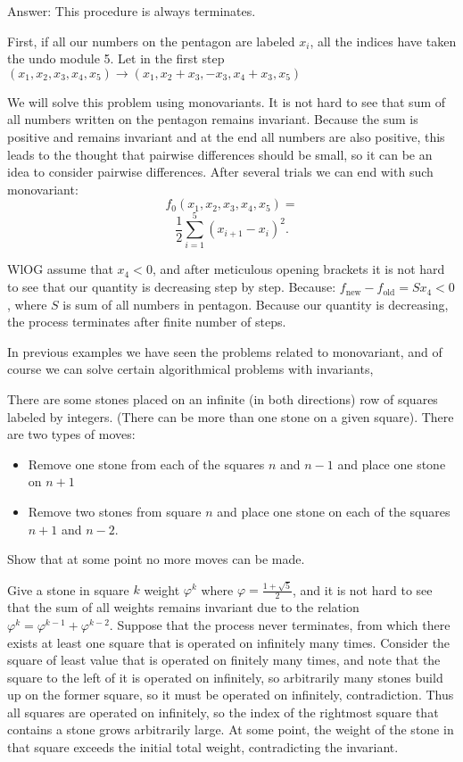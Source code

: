 \sol Answer: This procedure is always terminates.

First, if all our numbers on the pentagon are labeled $x_i$, all the indices have taken the undo module 5. Let in the first step $(x_1,x_2,x_3,x_4,x_5) \to (x_1,x_2+x_3,-x_3,x_4+x_3,x_5)$

We will solve this problem using monovariants. It is not hard to see that sum of all numbers written on the pentagon remains invariant. Because the sum is positive and remains invariant and at the end all numbers are also positive, this leads to the thought that pairwise differences should be small, so it can be an idea to consider pairwise differences. After several trials we can end with such monovariant: \[f_0(x_1,x_2,x_3,x_4,x_5)=\] \[\frac{1}{2} \sum_{i=1}^5 (x_{i+1}-x_i)^2.\]

WlOG assume that $x_4<0$, and after meticulous opening brackets it is not hard to see that our quantity is decreasing step by step. Because: $f_{\text{new}}-f_{\text{old}}=Sx_4<0$, where $S$ is sum of all numbers in pentagon. Because our quantity is decreasing, the process terminates after finite number of steps.

In previous examples we have seen the problems related to monovariant, and of course we can solve certain algorithmical problems with invariants,

\begin{example}
    There are some stones placed on an infinite (in both directions) row of squares labeled by integers. (There can be more than one stone on a given square). There are two types of moves:
    \begin{itemize}
        \item Remove one stone from each of the squares $n$ and $n-1$ and place one stone on $n+1$
        \item Remove two stones from square $n$ and place one stone on each of the squares $n+1$ and $n-2$.
    \end{itemize}
    Show that at some point no more moves can be made.
\end{example}

\sol Give a stone in square $k$ weight $\varphi^k$ where $\varphi=\frac{1+\sqrt{5}}{2}$, and it is not hard to see that the sum of all weights remains invariant due to the relation $\varphi^k = \varphi^{k-1} + \varphi^{k-2}$. Suppose that the process never terminates, from which there exists at least one square that is operated on infinitely many times. Consider the square of least value that is operated on finitely many times, and note that the square to the left of it is operated on infinitely, so arbitrarily many stones build up on the former square, so it must be operated on infinitely, contradiction. Thus all squares are operated on infinitely, so the index of the rightmost square that contains a stone grows arbitrarily large. At some point, the weight of the stone in that square exceeds the initial total weight, contradicting the invariant.

